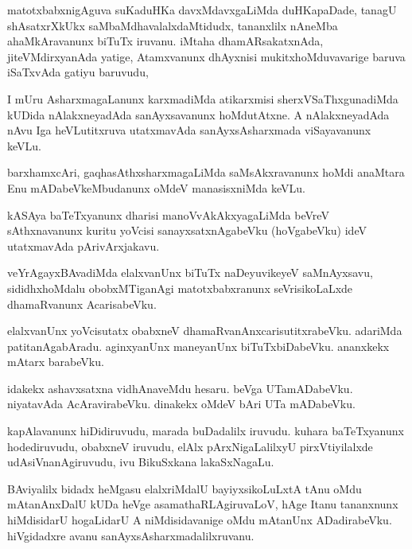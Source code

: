 \documentclass{article}
\begin{document}
\begin{mn}
matotxbabxnigAguva suKaduHKa davxMdavxgaLiMda duHKapaDade, tanagU
shAsatxrXkUkx saMbaMdhavalalxdaMtidudx, tananxlilx nAneMba
ahaMkAravanunx biTuTx iruvanu. iMtaha dhamARsakatxnAda,
jiteVMdirxyanAda yatige, Atamxvanunx dhAyxnisi mukitxhoMduvavarige
baruva iSaTxvAda gatiyu baruvudu,
\end{mn}

\begin{mn}
I mUru AsharxmagaLanunx karxmadiMda atikarxmisi sherxVSaThxgunadiMda
kUDida nAlakxneyadAda sanAyxsavanunx hoMdutAtxne. A nAlakxneyadAda
nAvu Iga heVLutitxruva utatxmavAda sanAyxsAsharxmada viSayavanunx keVLu.
\end{mn}

\begin{mn}%
barxhamxcAri, gaqhasAthxsharxmagaLiMda saMsAkxravanunx hoMdi anaMtara
Enu mADabeVkeMbudanunx oMdeV manasisxniMda keVLu.
\end{mn}

\begin{mn}
kASAya baTeTxyanunx dharisi manoVvAkAkxyagaLiMda beVreV sAthxnavanunx
kuritu yoVcisi sanayxsatxnAgabeVku (hoVgabeVku) ideV utatxmavAda pArivArxjakavu.
\end{mn}

\begin{mn}
veYrAgayxBAvadiMda elalxvanUnx biTuTx naDeyuvikeyeV saMnAyxsavu,
sididhxhoMdalu obobxMTiganAgi matotxbabxranunx seVrisikoLaLxde
dhamaRvanunx AcarisabeVku.
\end{mn}

\begin{mn}
elalxvanUnx yoVcisutatx obabxneV
dhamaRvanAnxcarisutitxrabeVku. adariMda patitanAgabAradu. aginxyanUnx
maneyanUnx biTuTxbiDabeVku. ananxkekx mAtarx barabeVku.
\end{mn}

\begin{mn}
idakekx ashavxsatxna vidhAnaveMdu hesaru. beVga
UTamADabeVku. niyatavAda AcAravirabeVku. dinakekx oMdeV bAri UTa mADabeVku.
\end{mn}

\begin{mn}%
kapAlavanunx hiDidiruvudu, marada buDadalilx iruvudu. kuhara
baTeTxyanunx hodediruvudu, obabxneV iruvudu, elAlx pArxNigaLalilxyU
pirxVtiyilalxde udAsiVnanAgiruvudu, ivu BikuSxkana lakaSxNagaLu.
\end{mn}

\begin{mn}
BAviyalilx bidadx heMgasu elalxriMdalU bayiyxsikoLuLxtA tAnu oMdu
mAtanAnxDalU kUDa heVge asamathaRLAgiruvaLoV, hAge Itanu tananxnunx
hiMdisidarU hogaLidarU A niMdisidavanige oMdu mAtanUnx
ADadirabeVku. hiVgidadxre avanu sanAyxsAsharxmadalilxruvanu.
\end{mn}
\end{document}
